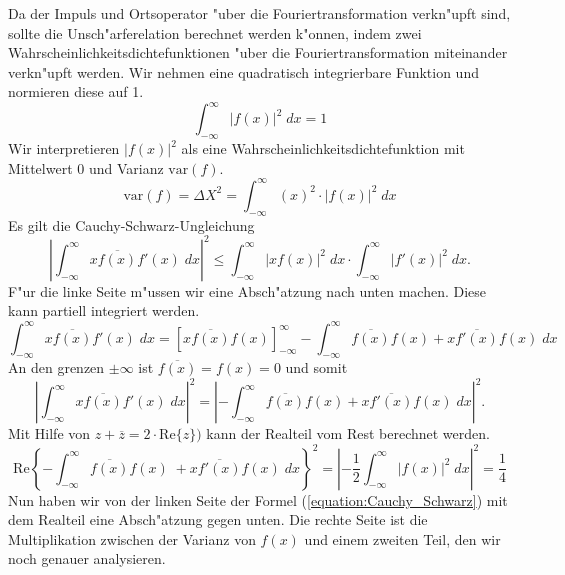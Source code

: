 \begin{refsection}
Da der Impuls und Ortsoperator "uber die Fouriertransformation verkn"upft sind, sollte die Unsch"arferelation berechnet werden k"onnen, indem zwei Wahrscheinlichkeitsdichtefunktionen "uber die Fouriertransformation miteinander verkn"upft werden.
Wir nehmen eine quadratisch integrierbare Funktion und normieren diese auf 1.
\begin{equation}
	\int_{-\infty}^{\infty} |f(x)|^{2} \; dx = 1
\end{equation}
Wir interpretieren $|f(x)|^{2}$ als eine Wahrscheinlichkeitsdichtefunktion mit Mittelwert 0 und Varianz $\text{var}(f)$.
\begin{equation}	
	\text{var}(f) = \varDelta X^{2} = \int_{-\infty}^{\infty} (x)^{2} \cdot |f(x)|^{2} \; dx
	\label{equation:varianz1.0}
\end{equation}
Es gilt die Cauchy-Schwarz-Ungleichung
\begin{equation}	
	\left| \int_{-\infty}^{\infty} x \overline{f(x)}  f'(x) \; dx\right|^{2} \leq  \int_{-\infty}^{\infty} \left| x f(x)\right|^{2}\; dx \cdot \int_{-\infty}^{\infty} \left| f'(x)\right|^{2}\; dx
	\label{equation:Cauchy_Schwarz}.
\end{equation}
F"ur die linke Seite m"ussen wir eine Absch"atzung nach unten machen.
Diese kann partiell integriert werden.
\begin{equation}	
	\int_{-\infty}^{\infty} x \overline{f(x)}  f'(x) \; dx = \left[ x \overline{f(x)}f(x) \right]_{-\infty}^{\infty}-  \int_{-\infty}^{\infty} \overline{f(x)}f(x) +  x \overline{f'(x)}  f(x)\; dx
\end{equation} 
An den grenzen $\pm \infty$ ist $\overline{f(x)}=f(x)=0$ und somit 
\begin{equation}	
\left| \int_{-\infty}^{\infty} x \overline{f(x)}  f'(x) \; dx\right|^{2}
= \left| -  \int_{-\infty}^{\infty} \overline{f(x)}f(x) +  x \overline{f'(x)}  f(x)\; dx\right| ^{2}.
\end{equation}
Mit Hilfe von $z + \overline{z}= 2 \cdot \text{Re}\lbrace z\rbrace)$ kann der Realteil vom Rest berechnet werden.
\begin{equation}
 \text{Re}\left\lbrace -\int_{-\infty}^{\infty} \overline{f(x)} f(x)\; +  x \overline{f'(x)}  f(x)\; dx \right\rbrace^{2} =
  \left| -\dfrac{1}{2} \int_{-\infty}^{\infty} \left| f(x)\right|^{2}\; dx \right|^{2}  = \frac{1}{4}
\end{equation}
Nun haben wir von der linken Seite der Formel (\ref{equation:Cauchy_Schwarz}) mit dem Realteil eine Absch"atzung gegen unten.
Die rechte Seite ist die Multiplikation zwischen der Varianz von $f(x)$ und einem zweiten Teil, den wir noch genauer analysieren.

\end{refsection}
